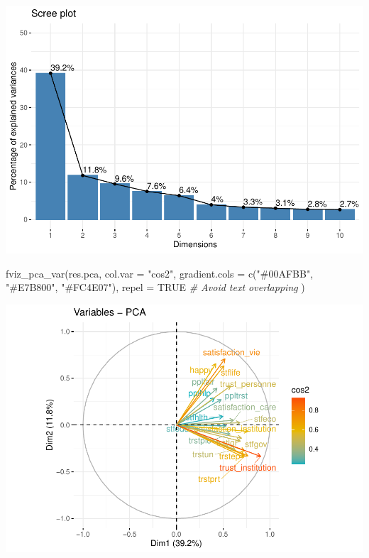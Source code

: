 \documentclass[
]{book}
\newenvironment{Shaded}{\begin{snugshade}}{\end{snugshade}}
\newcommand{\AttributeTok}[1]{\textcolor[rgb]{0.77,0.63,0.00}{#1}}
\newcommand{\CommentTok}[1]{\textcolor[rgb]{0.56,0.35,0.01}{\textit{#1}}}
\newcommand{\ConstantTok}[1]{\textcolor[rgb]{0.00,0.00,0.00}{#1}}
\newcommand{\FunctionTok}[1]{\textcolor[rgb]{0.00,0.00,0.00}{#1}}
\newcommand{\NormalTok}[1]{#1}
\newcommand{\StringTok}[1]{\textcolor[rgb]{0.31,0.60,0.02}{#1}}
\begin{document}
\includegraphics{bookdown-demo_files/figure-latex/1103-4.pdf}

\begin{Shaded}
\begin{Highlighting}[]
\FunctionTok{fviz\_pca\_var}\NormalTok{(res.pca, }\AttributeTok{col.var =} \StringTok{"cos2"}\NormalTok{,}
             \AttributeTok{gradient.cols =} \FunctionTok{c}\NormalTok{(}\StringTok{"\#00AFBB"}\NormalTok{, }\StringTok{"\#E7B800"}\NormalTok{, }\StringTok{"\#FC4E07"}\NormalTok{), }
             \AttributeTok{repel =} \ConstantTok{TRUE} \CommentTok{\# Avoid text overlapping}
\NormalTok{             )}
\end{Highlighting}
\end{Shaded}

\includegraphics{bookdown-demo_files/figure-latex/1103-5.pdf}
\end{document}
